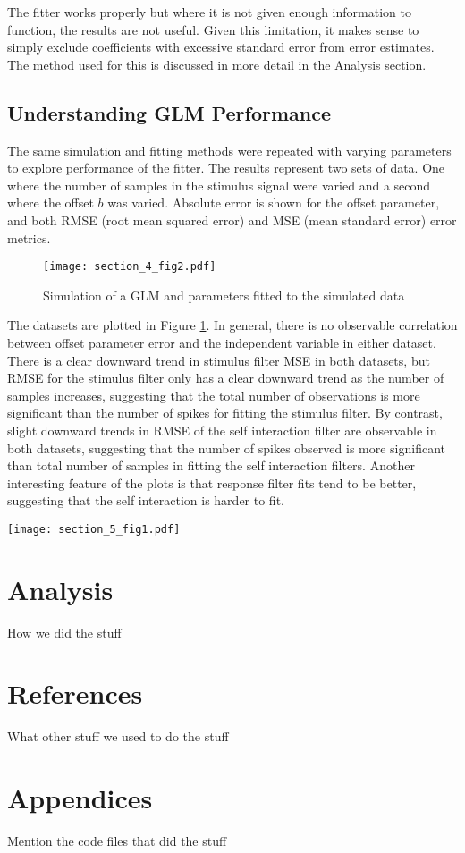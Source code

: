 \documentclass[letterpaper,titlepage,10pt]{article}
\begin{document}
The fitter works properly but where it is not given enough information to function, the results are not useful. Given
this limitation, it makes sense to simply exclude coefficients with excessive standard error from error estimates. The
method used for this is discussed in more detail in the Analysis section.

\subsection{Understanding GLM Performance}

The same simulation and fitting methods were repeated with varying parameters to explore performance of the fitter.
The results represent two sets of data. One where the number of samples in the stimulus signal were varied and a
second where the offset $b$ was varied. Absolute error is shown for the offset parameter, and both RMSE (root mean
squared error) and MSE (mean standard error) error metrics.

\begin{figure}[h]
\texttt{[image: section\_4\_fig2.pdf]}
\caption{Simulation of a GLM and parameters fitted to the simulated data}
\label{fig42}
\end{figure}

The datasets are plotted in Figure \ref{fig42}. In general, there is no observable correlation between offset parameter
error and the independent variable in either dataset. There is a clear downward trend in stimulus filter MSE in both
datasets, but RMSE for the stimulus filter only has a clear downward trend as the number of samples increases,
suggesting that the total number of observations is more significant than the number of spikes for fitting the stimulus
filter. By contrast, slight downward trends in RMSE of the self interaction filter are observable in both datasets,
suggesting that the number of spikes observed is more significant than total number of samples in fitting the self
interaction filters. Another interesting feature of the plots is that response filter fits tend to be better,
suggesting that the self interaction is harder to fit.

\texttt{[image: section\_5\_fig1.pdf]}\\
\section{Analysis}
How we did the stuff
\section{References}
What other stuff we used to do the stuff
\section{Appendices}
Mention the code files that did the stuff
\end{document}
